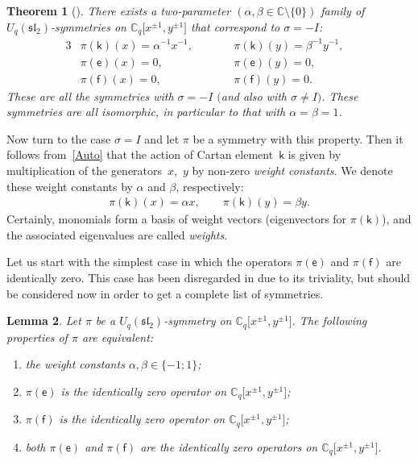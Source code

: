 \documentclass[pdftex]{sigma}
\numberwithin{equation}{section}
\newtheorem{Theorem}{Theorem}[section]
\newtheorem{Lemma}[Theorem]{Lemma}
\begin{document}
\begin{Theorem}[{\cite[Theorem 3.5, type (I)]{S}}]\label{sigma=-I}
There exists a two-parameter $(\alpha,\beta\in\mathbb{C}{\setminus}\{0\})$ family of $U_q(\mathfrak{sl}_2)$-symmetries on $\mathbb{C}_q\big[x^{\pm 1},y^{\pm 1}\big]$ that correspond to $\sigma=-I$:
\begin{alignat*}{3}
&\pi(\mathsf{k})(x)=\alpha^{-1}x^{-1}, \qquad && \pi(\mathsf{k})(y) =\beta^{-1}y^{-1}, &\\
& \pi(\mathsf{e})(x) =0,\qquad & & \pi(\mathsf{e})(y) =0, &\\
& \pi(\mathsf{f})(x) =0,\qquad && \pi(\mathsf{f})(y) =0. &
\end{alignat*}
These are all the symmetries with $\sigma=-I$ $($and also with $\sigma\ne I)$. These symmetries are all isomorphic, in particular to that with $\alpha=\beta=1$.
\end{Theorem}

Now turn to the case $\sigma=I$ and let $\pi$ be a symmetry with this property. Then it follows from~\eqref{Auto} that the action of Cartan element~$\mathsf{k}$ is given by multiplication of the generators~$x$,~$y$ by non-zero {\it weight constants}. We denote these weight constants by $\alpha$ and $\beta$, respectively:
\begin{gather*}\pi(\mathsf{k})(x)=\alpha x,\qquad\pi(\mathsf{k})(y)=\beta y.\end{gather*}
Certainly, monomials form a basis of weight vectors (eigenvectors for $\pi(\mathsf{k})$), and the associated eigenvalues are called {\it weights}.

Let us start with the simplest case in which the operators $\pi(\mathsf{e})$ and $\pi(\mathsf{f})$ are identically zero. This case has been disregarded in \cite{S} due to its triviality, but should be considered now in order to get a complete list of symmetries.

\begin{Lemma}\label{iz}Let $\pi$ be a $U_q(\mathfrak{sl}_2)$-symmetry on $\mathbb{C}_q\big[x^{\pm 1},y^{\pm 1}\big]$. The following properties of $\pi$ are equivalent:
\begin{enumerate}\itemsep=0pt
\item[$(i)$] the weight constants $\alpha,\beta\in\{-1;1\}$;
\item[$(ii)$] $\pi(\mathsf{e})$ is the identically zero operator on $\mathbb{C}_q\big[x^{\pm 1},y^{\pm 1}\big]$;
\item[$(iii)$] $\pi(\mathsf{f})$ is the identically zero operator on $\mathbb{C}_q\big[x^{\pm 1},y^{\pm 1}\big]$;
\item[$(iv)$] both $\pi(\mathsf{e})$ and $\pi(\mathsf{f})$ are the identically zero operators on $\mathbb{C}_q\big[x^{\pm 1},y^{\pm 1}\big]$.
\end{enumerate}
\end{Lemma}
\end{document}

